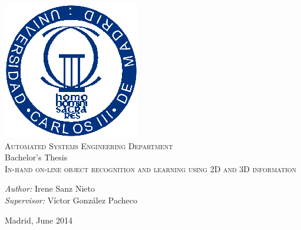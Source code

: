 \begin{titlepage}
\begin{center}

 \includegraphics[size=0.8]{img/uc3m.eps}  \\[0.5 cm]

\large \textsc{Automated Systems Engineering Department} \\ [1 cm]

\large Bachelor's Thesis\\[1 cm]

\huge \textsc{In-hand on-line object recognition and learning using 2D and 3D information}\\[13 cm]


\begin{flushleft} \Large
\emph{Author:} Irene Sanz Nieto\\[0.5 cm]
\emph{Supervisor:} Víctor González Pacheco \\

\end{flushleft}

\vfill

{\large Madrid, June 2014}

\end{center}
\end{titlepage}
